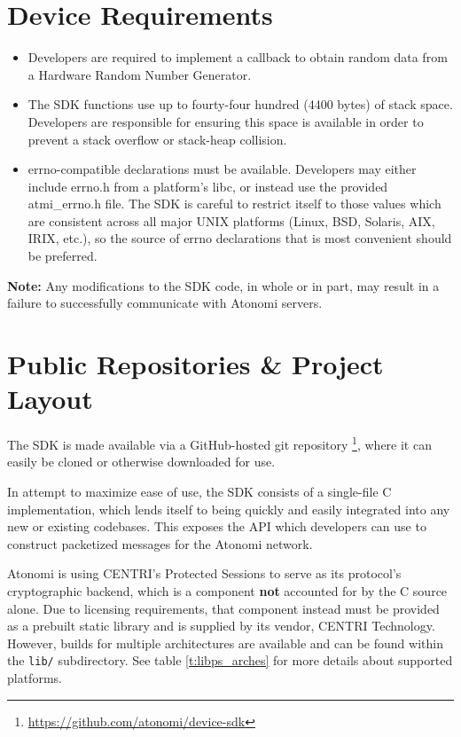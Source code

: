 \section{Device Requirements}
\begin{itemize}
	\item Developers are required to implement a callback to obtain random data from
a Hardware Random Number Generator.
	\item The SDK functions use up to fourty-four hundred (4400 bytes) of stack space.
		Developers are responsible for ensuring this space is available
		in order to prevent a stack overflow or stack-heap collision.
	\item errno-compatible declarations must be available. Developers may either
		include errno.h from a platform's libc, or instead use the provided
		atmi_errno.h file. The SDK is careful to restrict itself to those
		values which are consistent across all major UNIX platforms (Linux, BSD,
		Solaris, AIX, IRIX, etc.), so the source of errno declarations
		that is most convenient should be preferred.
\end{itemize}

\textbf{Note:} Any modifications to the SDK code, in whole or in part, may
result in a failure to successfully communicate with Atonomi servers.


\section{Public Repositories \&{} Project Layout}
The SDK is made available via a GitHub-hosted git repository
\footnote{\url{https://github.com/atonomi/device-sdk}},
where it can easily be cloned or otherwise downloaded for use.

In attempt to maximize ease of use, the SDK consists of a
single-file C implementation, which lends itself to being quickly and
easily integrated into any new or existing codebases. This exposes
the API which developers can use to construct packetized messages for
the Atonomi network.

Atonomi is using CENTRI's Protected Sessions to serve as its protocol's
cryptographic backend, which is a component
\textbf{not} accounted for by the C source alone. Due to licensing
requirements, that component instead must be provided as a prebuilt
static library and is supplied by its vendor, CENTRI Technology.
However, builds for multiple architectures are available and can be
found within the \texttt{lib/} subdirectory. See table \ref{t:libps_arches}
for more details about supported platforms.

